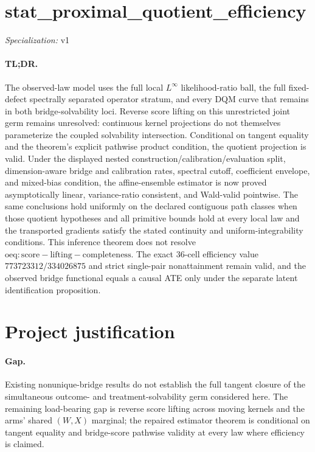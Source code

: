 \documentclass{article}
\begin{document}
\sloppy

\section*{stat\_\allowbreak{}proximal\_\allowbreak{}quotient\_\allowbreak{}efficiency}

\noindent\textit{Specialization:} v1\par

\paragraph{TL;DR.} The observed-law model uses the full local \(L^\infty\) likelihood-ratio ball, the full fixed-defect spectrally separated operator stratum, and every DQM curve that remains in both bridge-solvability loci. Reverse score lifting on this unrestricted joint germ remains unresolved: continuous kernel projections do not themselves parameterize the coupled solvability intersection. Conditional on tangent equality and the theorem's explicit pathwise product condition, the quotient projection is valid. Under the displayed nested construction/calibration/evaluation split, dimension-aware bridge and calibration rates, spectral cutoff, coefficient envelope, and mixed-bias condition, the affine-ensemble estimator is now proved asymptotically linear, variance-ratio consistent, and Wald-valid pointwise. The same conclusions hold uniformly on the declared contiguous path classes when those quotient hypotheses and all primitive bounds hold at every local law and the transported gradients satisfy the stated continuity and uniform-integrability conditions. This inference theorem does not resolve \(\mathrm{oeq:score-lifting-completeness}\). The exact \(36\)-cell efficiency value \(773723312/334026875\) and strict single-pair nonattainment remain valid, and the observed bridge functional equals a causal ATE only under the separate latent identification proposition.

\section{Project justification}

\paragraph{Gap.} Existing nonunique-bridge results do not establish the full tangent closure of the simultaneous outcome- and treatment-solvability germ considered here. The remaining load-bearing gap is reverse score lifting across moving kernels and the arms' shared \((W,X)\) marginal; the repaired estimator theorem is conditional on tangent equality and bridge-score pathwise validity at every law where efficiency is claimed.
\end{document}
